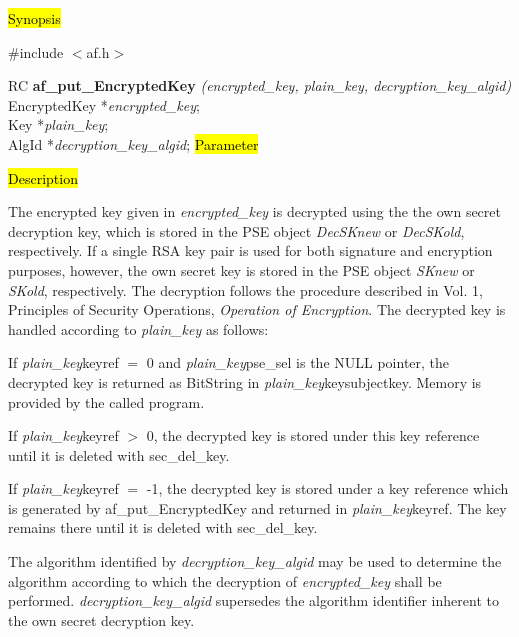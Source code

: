 \hl{Synopsis}

\#include $<$af.h$>$ 

RC {\bf af\_put\_EncryptedKey} {\em (encrypted\_key, plain\_key, decryption\_key\_algid)} \\
EncryptedKey *{\em encrypted\_key}; \\
Key *{\em plain\_key}; \\
AlgId *{\em decryption\_key\_algid};
\hl{Parameter}




\hl{Description}

The encrypted key given in {\em encrypted\_key} is decrypted using the
the own secret decryption key, which is stored in the PSE object
{\em DecSKnew} or {\em DecSKold}, respectively. If a single RSA key pair is used for both signature and encryption
purposes, however, the own secret key is stored in the PSE object {\em SKnew} or {\em SKold}, respectively.
The decryption follows the procedure described in Vol. 1, Principles of Security Operations, 
{\em Operation of Encryption}.
The decrypted key is handled according to {\em plain\_key} as follows:

If {\em plain\_key}\pf keyref $=$ 0 and {\em plain\_key}\pf pse\_sel is the NULL pointer, the decrypted key is
returned as BitString in {\em plain\_key}\pf key\pf subjectkey. Memory is provided by the called program. 

If {\em plain\_key}\pf keyref $>$ 0, the decrypted key is stored under this key reference until it is
deleted with sec\_del\_key. 

If {\em plain\_key}\pf keyref $=$ -1, the decrypted key is stored under a key reference which is generated 
by af\_put\_EncryptedKey and returned in {\em plain\_key}\pf keyref. The key remains there until it is deleted
with sec\_del\_key. 

The algorithm identified by {\em decryption\_key\_algid} may be used to determine the algorithm
according to which the decryption of {\em encrypted\_key} shall be performed. {\em decryption\_key\_algid}
supersedes the algorithm identifier inherent to the own secret decryption key.

